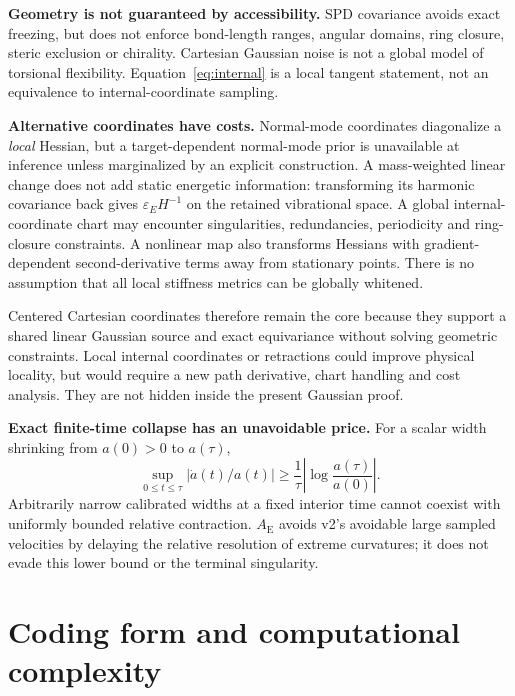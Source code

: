 \documentclass[11pt,letterpaper]{article}
\newcommand{\epsE}{\varepsilon_E}
\newcommand{\AltE}{A_{\mathrm E}}
\begin{document}
\textbf{Geometry is not guaranteed by accessibility.} SPD covariance avoids exact freezing, but does not enforce bond-length ranges, angular domains, ring closure, steric exclusion or chirality. Cartesian Gaussian noise is not a global model of torsional flexibility. Equation~\eqref{eq:internal} is a local tangent statement, not an equivalence to internal-coordinate sampling.

\textbf{Alternative coordinates have costs.} Normal-mode coordinates diagonalize a \emph{local} Hessian, but a target-dependent normal-mode prior is unavailable at inference unless marginalized by an explicit construction. A mass-weighted linear change does not add static energetic information: transforming its harmonic covariance back gives $\epsE H^{-1}$ on the retained vibrational space. A global internal-coordinate chart may encounter singularities, redundancies, periodicity and ring-closure constraints. A nonlinear map also transforms Hessians with gradient-dependent second-derivative terms away from stationary points. There is no assumption that all local stiffness metrics can be globally whitened.

Centered Cartesian coordinates therefore remain the core because they support a shared linear Gaussian source and exact equivariance without solving geometric constraints. Local internal coordinates or retractions could improve physical locality, but would require a new path derivative, chart handling and cost analysis. They are not hidden inside the present Gaussian proof.

\textbf{Exact finite-time collapse has an unavoidable price.} For a scalar width shrinking from $a(0)>0$ to $a(\tau)$,
\begin{equation}
\sup_{0\leq t\leq\tau}|\dot a(t)/a(t)|
\geq\frac1\tau\left|\log\frac{a(\tau)}{a(0)}\right|.
\end{equation}
Arbitrarily narrow calibrated widths at a fixed interior time cannot coexist with uniformly bounded relative contraction. $\AltE$ avoids v2's avoidable large sampled velocities by delaying the relative resolution of extreme curvatures; it does not evade this lower bound or the terminal singularity.

\section{Coding form and computational complexity}
\label{sec:coding}
\end{document}
